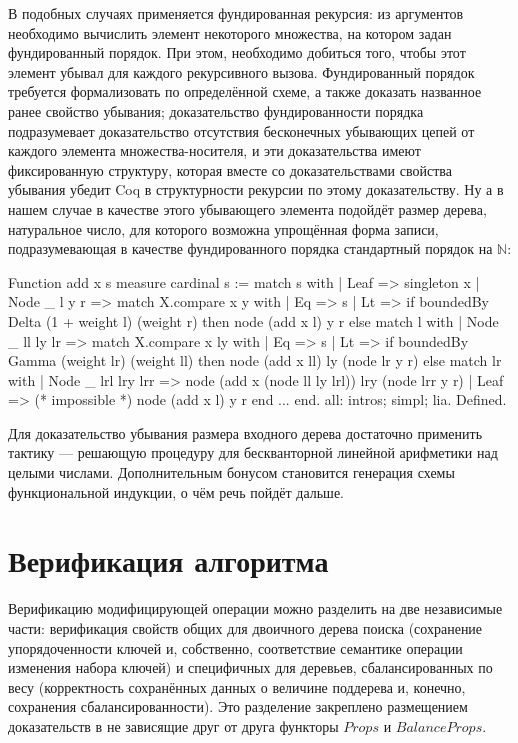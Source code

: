 \documentclass[a4paper,14pt]{extarticle}
\begin{document}
В подобных случаях применяется фундированная рекурсия:
из аргументов необходимо вычислить элемент некоторого множества, на котором
задан фундированный порядок. При этом, необходимо добиться того, чтобы этот
элемент убывал для каждого рекурсивного вызова. Фундированный порядок требуется
формализовать по определённой схеме, а также доказать названное ранее свойство
убывания; доказательство фундированности порядка подразумевает доказательство
отсутствия бесконечных убывающих цепей от каждого элемента множества-носителя, и
эти доказательства имеют фиксированную структуру, которая вместе со
доказательствами свойства убывания убедит Coq в структурности рекурсии по этому
доказательству. Ну а в нашем случае в качестве этого убывающего элемента
подойдёт размер дерева, натуральное число, для которого возможна упрощённая
форма записи, подразумевающая в качестве фундированного порядка стандартный
порядок на \( \mathbb{N} \):

\begin{coqcode}

Function add x s {measure cardinal s} := match s with
| Leaf => singleton x
| Node _ l y r =>
  match X.compare x y with
  | Eq => s
  | Lt =>
    if boundedBy Delta (1 + weight l) (weight r)
    then node (add x l) y r
    else match l with
    | Node _ ll ly lr =>
      match X.compare x ly with
      | Eq => s
      | Lt =>
        if boundedBy Gamma (weight lr) (weight ll)
        then node (add x ll) ly (node lr y r)
        else match lr with
        | Node _ lrl lry lrr =>
          node (add x (node ll ly lrl)) lry (node lrr y r)
        | Leaf => (* impossible *) node (add x l) y r
        end
      ...
end.
all: intros; simpl; lia. Defined.

\end{coqcode}

Для доказательство убывания размера входного дерева
достаточно применить тактику  ---
решающую процедуру для бескванторной линейной арифметики
над целыми числами\cite{micromega}.
Дополнительным бонусом становится генерация схемы функциональной
индукции, о чём речь пойдёт дальше.

\clearpage
\section{Верификация алгоритма}

Верификацию модифицирующей операции можно разделить
на две независимые части:
верификация свойств общих для двоичного дерева поиска
(сохранение упорядоченности ключей и, собственно,
соответствие семантике операции изменения набора ключей)
и специфичных для деревьев, сбалансированных по весу
(корректность сохранённых данных о величине поддерева
и, конечно, сохранения сбалансированности).
Это разделение закреплено размещением
доказательств в не зависящие друг от друга функторы
\( Props \) и \( BalanceProps \).
\end{document}
